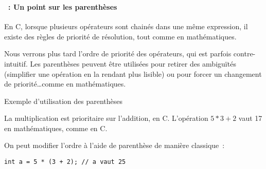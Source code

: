 \begin{frame}[containsverbatim]
  \frametitle{\secname}
  \framesubtitle{\subsecname~: Un point sur les parenthèses} 

  En C, lorsque plusieurs opérateurs sont chainés dans une même expression, il existe des règles de priorité de résolution, tout comme en mathématiques.
  \vspace{0.5cm}
  \par
  Nous verrons plus tard l'ordre de priorité des opérateurs, qui est parfois contre-intuitif. Les parenthèses peuvent être utilisées pour retirer
  des ambiguïtés (simplifier une opération en la rendant plus lisible) ou pour forcer un changement de priorité\ldots comme en mathématiques.
  \vspace{0.5cm}
  \begin{exampleblock}{Exemple d'utilisation des parenthèses}
    \par
    La multiplication est prioritaire sur l'addition, en C. L'opération $5 * 3 + 2$ vaut 17 en mathématiques, comme en C.
    \par
    On peut modifier l'ordre à l'aide de parenthèse de manière classique~:
    \begin{verbatim}
int a = 5 * (3 + 2); // a vaut 25 \end{verbatim}   
  \end{exampleblock}
\end{frame}

